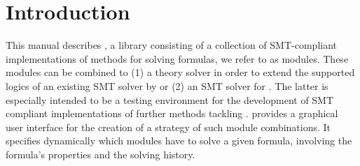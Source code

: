 \chapter{Introduction}
\label{chapter:intro}
This manual describes \smtrat, a \Cpp library consisting of a collection of
SMT-compliant implementations of methods for solving \supportedLogicsText 
formulas, we refer to as modules. These modules can be 
combined to (1) a theory solver in order to extend the supported logics of an
existing SMT solver by \supportedLogics or (2) an SMT solver for \supportedLogics. 
The latter is especially intended to be a testing environment for the development 
of SMT compliant implementations of further methods tackling \supportedLogics.
\smtrat provides a graphical user interface for the creation of a strategy of such
module combinations. It specifies dynamically which modules have to solve a 
given \supportedLogics formula, involving the formula's properties and the solving 
history.
